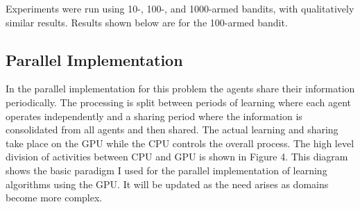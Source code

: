 \documentclass[11pt]{article} %
\begin{document}
Experiments were run using 10-, 100-, and 1000-armed bandits, with qualitatively similar results.  Results shown below are for the 100-armed bandit.

\subsection{Parallel Implementation}
In the parallel implementation for this problem the agents share their information periodically.  The processing is split between periods of learning where each agent operates independently and a sharing period where the information is consolidated from all agents and then shared.  The actual learning and sharing take place on the GPU while the CPU controls the overall process.  The high level division of activities between CPU and GPU is shown in Figure 4.  This diagram shows the basic paradigm I used for the parallel implementation of learning algorithms using the GPU.  It will be updated as the need arises as domains become more complex.
\end{document}
